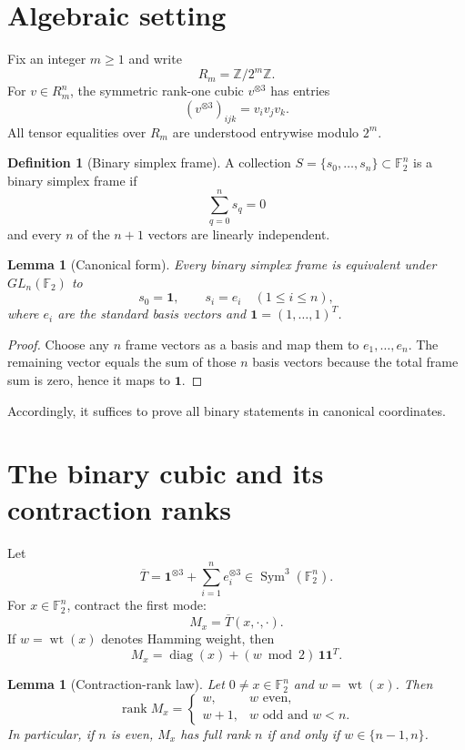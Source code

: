 \documentclass[11pt]{article}
\newtheorem{lemma}[theorem]{Lemma}
\theoremstyle{definition}
\newtheorem{definition}[theorem]{Definition}
\newcommand{\F}{\mathbb{F}}
\newcommand{\Z}{\mathbb{Z}}
\newcommand{\one}{\mathbf{1}}
\newcommand{\Sym}{\operatorname{Sym}}
\newcommand{\rank}{\operatorname{rank}}
\newcommand{\wt}{\operatorname{wt}}
\begin{document}
\section{Algebraic setting}
Fix an integer $m\ge 1$ and write
\[
R_m=\Z/2^m\Z.
\]
For $v\in R_m^n$, the symmetric rank-one cubic $v^{\otimes 3}$ has entries
\[
(v^{\otimes 3})_{ijk}=v_i v_j v_k.
\]
All tensor equalities over $R_m$ are understood entrywise modulo $2^m$.

\begin{definition}[Binary simplex frame]
A collection $S=\{s_0,\ldots,s_n\}\subset \F_2^n$ is a binary simplex frame if
\[
\sum_{q=0}^{n}s_q=0
\]
and every $n$ of the $n+1$ vectors are linearly independent.
\end{definition}

\begin{lemma}[Canonical form]\label{lem:canonical}
Every binary simplex frame is equivalent under $GL_n(\F_2)$ to
\[
s_0=\one,\qquad s_i=e_i\quad (1\le i\le n),
\]
where $e_i$ are the standard basis vectors and $\one=(1,\ldots,1)^T$.
\end{lemma}

\begin{proof}
Choose any $n$ frame vectors as a basis and map them to $e_1,\ldots,e_n$. The remaining vector equals the sum of those $n$ basis vectors because the total frame sum is zero, hence it maps to $\one$.
\end{proof}

Accordingly, it suffices to prove all binary statements in canonical coordinates.

\section{The binary cubic and its contraction ranks}
Let
\[
\overline{T}=\one^{\otimes 3}+\sum_{i=1}^{n} e_i^{\otimes 3}\in \Sym^3(\F_2^n).
\]
For $x\in\F_2^n$, contract the first mode:
\[
M_x=\overline{T}(x,\cdot,\cdot).
\]
If $w=\wt(x)$ denotes Hamming weight, then
\begin{equation}\label{eq:Mx}
M_x=\operatorname{diag}(x)+(w\bmod 2)\,\one\one^T.
\end{equation}

\begin{lemma}[Contraction-rank law]\label{lem:ranklaw}
Let $0\ne x\in\F_2^n$ and $w=\wt(x)$. Then
\[
\rank M_x=
\begin{cases}
w, & w\text{ even},\\
w+1, & w\text{ odd and }w<n.
\end{cases}
\]
In particular, if $n$ is even, $M_x$ has full rank $n$ if and only if $w\in\{n-1,n\}$.
\end{lemma}
\end{document}
